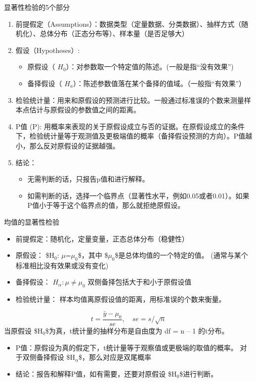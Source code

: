 \documentclass[presentation]{beamer}
\begin{document}
\begin{frame}[label={sec:org52ca1c2}]{显著性检验的5个部分}
\begin{enumerate}
\item 前提假定（Assumptions）：数据类型（定量数据、分类数据）、抽样方式（随机化）、总体分布（正态分布等）、样本量（是否足够大）

\item 假设（Hypotheses）:   
\begin{itemize}
\item 原假设（ \(H_0\)）：对参数取一个特定值的陈述。(一般是指“没有效果”)
\item 备择假设（ \(H_a\)）：陈述参数值落在某个备择的值域。（一般指“有效果”）
\end{itemize}

\item 检验统计量：用来和原假设的预测进行比较。一般通过标准误的个数来测量样本点估计与原假设的参数值之间的距离。

\item P值 (P): 用概率来表现的关于原假设成立与否的证据。在原假设成立的条件下，检验统计量等于观测值及更极端值的概率（备择假设预测的方向）。P值越小，那么反对原假设的证据越强。

\item 结论：   
\begin{itemize}
\item 无需判断的话，只报告p值和进行解释。
\item 如需判断的话，选择一个临界点（显著性水平，例如0.05或者0.01）。如果P值小于等于这个临界点的值，那么就拒绝原假设。
\end{itemize}
\end{enumerate}
\end{frame}

\begin{frame}[label={sec:orgd8f86a5}]{均值的显著性检验}
\begin{itemize}
\item 前提假定：随机化，定量变量，正态总体分布（稳健性）

\item 原假设： \$H\(_{\text{0}}\): \(\mu\)=\(\mu_{\text{0}}\)\$，其中 \$\(\mu_{\text{0}}\)\$是总体均值的一个特定的值。
(通常与某个标准相比没有效果或没有变化)

\item 备择假设： \(H_{\alpha}: \mu \neq \mu_0\) 
双侧备择包括大于和小于原假设值

\item 检验统计量： 样本均值离原假设值的距离，用标准误的个数来衡量。
\end{itemize}
$$t=\frac{\bar y-\mu_0}{se}, \quad se=s/\sqrt n$$
当原假设 \$H\(_{\text{0}}\)\$为真，t统计量的抽样分布是自由度为 df = n – 1 的t分布。

\begin{itemize}
\item P值：原假设为真的假定下，t统计量等于观察值或更极端的取值的概率。
对于双侧备择假设 \$H\(_{\alpha}\)\$，那么对应是双尾概率

\item 结论：报告和解释P值，如有需要，还要对原假设 \$H\(_{\text{0}}\)\$进行判断。
\end{itemize}
\end{frame}
\end{document}
